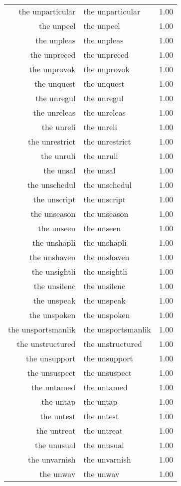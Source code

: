 \begin{table}[ht]
\begin{tabular}{rlr}
  the unparticular & the unparticular & 1.00 \\ 
  the unpeel & the unpeel & 1.00 \\ 
  the unpleas & the unpleas & 1.00 \\ 
  the unpreced & the unpreced & 1.00 \\ 
  the unprovok & the unprovok & 1.00 \\ 
  the unquest & the unquest & 1.00 \\ 
  the unregul & the unregul & 1.00 \\ 
  the unreleas & the unreleas & 1.00 \\ 
  the unreli & the unreli & 1.00 \\ 
  the unrestrict & the unrestrict & 1.00 \\ 
  the unruli & the unruli & 1.00 \\ 
  the unsal & the unsal & 1.00 \\ 
  the unschedul & the unschedul & 1.00 \\ 
  the unscript & the unscript & 1.00 \\ 
  the unseason & the unseason & 1.00 \\ 
  the unseen & the unseen & 1.00 \\ 
  the unshapli & the unshapli & 1.00 \\ 
  the unshaven & the unshaven & 1.00 \\ 
  the unsightli & the unsightli & 1.00 \\ 
  the unsilenc & the unsilenc & 1.00 \\ 
  the unspeak & the unspeak & 1.00 \\ 
  the unspoken & the unspoken & 1.00 \\ 
  the unsportsmanlik & the unsportsmanlik & 1.00 \\ 
  the unstructured & the unstructured & 1.00 \\ 
  the unsupport & the unsupport & 1.00 \\ 
  the unsuspect & the unsuspect & 1.00 \\ 
  the untamed & the untamed & 1.00 \\ 
  the untap & the untap & 1.00 \\ 
  the untest & the untest & 1.00 \\ 
  the untreat & the untreat & 1.00 \\ 
  the unusual & the unusual & 1.00 \\ 
  the unvarnish & the unvarnish & 1.00 \\ 
  the unwav & the unwav & 1.00 \\ 

\end{tabular}
\end{table}
